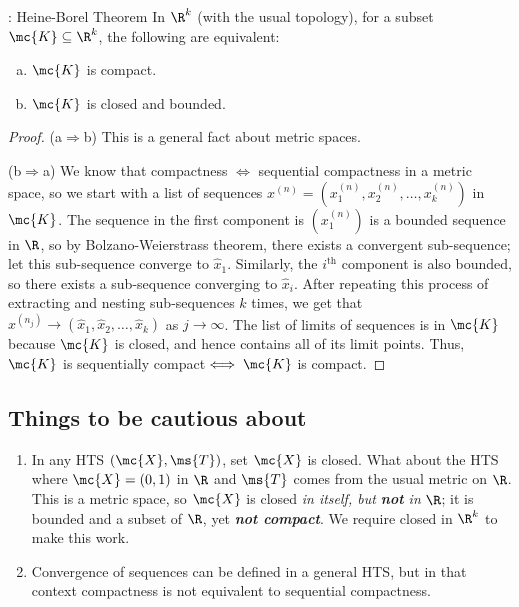 \begin{ntheorem}{: Heine-Borel Theorem}
	In \(\R^k\) (with the usual topology), for a subset \(\mc{K}\subseteq\R^k\), the following are equivalent:
	\begin{enumerate}[(a)]
		\item \(\mc{K}\) is compact.
		
		\item \(\mc{K}\) is closed and bounded.
	\end{enumerate}
\end{ntheorem}

\begin{proof}
	(a\(\Rightarrow\)b) This is a general fact about metric spaces.
	
	\medskip
	
	(b\(\Rightarrow\)a) We know that compactness \(\iff\) sequential compactness in a metric space, so we start with a list of sequences \(x^{(n)}=(x_1^{(n)},x_2^{(n)},\dots,x_k^{(n)})\) in \(\mc{K}\). The sequence in the first component is \((x_1^{(n)})\) is a bounded sequence in \(\R\), so by Bolzano-Weierstrass theorem, there exists a convergent sub-sequence; let this sub-sequence converge to \(\hat{x}_1\). Similarly, the \(i^{\text{th}}\) component is also bounded, so there exists a sub-sequence converging to \(\hat{x}_i\). After repeating this process of extracting and nesting sub-sequences \(k\) times, we get that \(x^{(n_j)}\to(\hat{x}_1,\hat{x}_2,\dots,\hat{x}_k)\) as \(j\to\infty\). The list of limits of sequences is in \(\mc{K}\) because \(\mc{K}\) is closed, and hence contains all of its limit points. Thus, \(\mc{K}\) is sequentially compact\(\iff\mc{K}\) is compact. 
\end{proof}

\subsection*{Things to be cautious about}
\begin{enumerate}
	\item In any HTS \((\mc{X},\ms{T})\), set \(\mc{X}\) is closed. What about the HTS where \(\mc{X}=(0,1)\) in \(\R\) and \(\ms{T}\) comes from the usual metric on \(\R\). This is a metric space, so \(\mc{X}\) is closed \emph{in itself, but \textbf{not} in} \(\R\); it is bounded and a subset of \(\R\), yet \emph{\textbf{not compact}}. We require closed in \(\R^k\) to make this work.
	
	\item Convergence of sequences can be defined in a general HTS, but in that context compactness is not equivalent to sequential compactness.
\end{enumerate}

